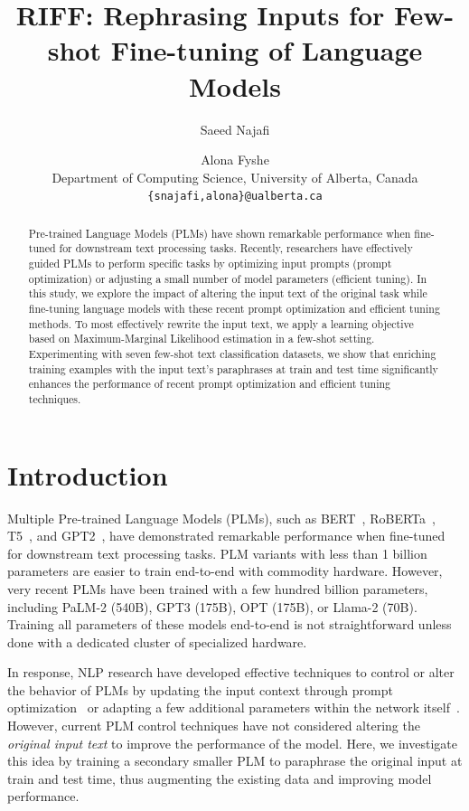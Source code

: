 \documentclass[11pt]{article}
\title{RIFF: Rephrasing Inputs for Few-shot Fine-tuning of Language Models}
\author{Saeed Najafi \and
  Alona Fyshe \\
  Department of Computing Science, University of Alberta, Canada\\
  \texttt{\{snajafi,alona\}@ualberta.ca} \\}
\begin{document}
\maketitle
\begin{abstract}
Pre-trained Language Models (PLMs) have shown remarkable performance when fine-tuned for downstream text processing tasks. Recently, researchers have effectively guided PLMs to perform specific tasks by optimizing input prompts (prompt optimization) or adjusting a small number of model parameters (efficient tuning). In this study, we explore the impact of altering the input text of the original task while fine-tuning language models with these recent prompt optimization and efficient tuning methods. To most effectively rewrite the input text, we apply a learning objective based on Maximum-Marginal Likelihood estimation in a few-shot setting. Experimenting with seven few-shot text classification datasets, we show that enriching training examples with the input text's paraphrases at train and test time significantly enhances the performance of recent prompt optimization and efficient tuning techniques.
\end{abstract}


\section{Introduction}
Multiple Pre-trained Language Models (PLMs), such as BERT~\cite{devlin-etal-2019-bert}, RoBERTa~\cite{DBLP:journals/corr/abs-1907-11692}, T5~\cite{DBLP:journals/corr/abs-1910-10683}, and GPT2~\cite{radford2019language}, have demonstrated remarkable performance when fine-tuned for downstream text processing tasks. PLM variants with less than 1 billion parameters are easier to train end-to-end with commodity hardware. However, very recent PLMs have been trained with a few hundred billion parameters, including PaLM-2 (540B)\cite{anil2023palm}, GPT3 (175B)\cite{brown2020language}, OPT (175B)\cite{zhang2022opt}, or Llama-2 (70B)\cite{touvron2023llama}. Training all parameters of these models end-to-end is not straightforward unless done with a dedicated cluster of specialized hardware.

In response, NLP research have developed effective techniques to control or alter the behavior of PLMs by updating the input context through prompt optimization~\cite{DBLP:journals/corr/abs-2107-13586} or adapting a few additional parameters within the network itself~\cite{DBLP:journals/corr/abs-2106-09685}. 
However, current PLM control techniques have not considered altering the \textit{original input text} to improve the performance of the model.  Here, we investigate this idea by training a secondary smaller PLM to paraphrase the original input at train and test time, thus augmenting the existing data and improving model performance.
\end{document}
